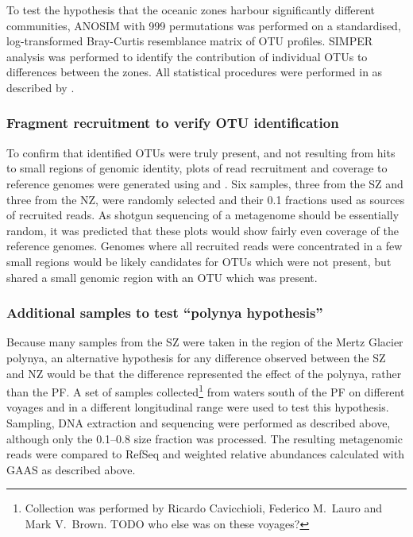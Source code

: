 To test the hypothesis that the oceanic zones harbour significantly different communities, \ac{ANOSIM} with 999 permutations was performed on a standardised, log-transformed Bray-Curtis resemblance matrix of \ac{OTU} profiles.
\ac{SIMPER} analysis was performed to identify the contribution of individual \acp{OTU} to differences between the zones. 
All statistical procedures were performed in  as described by \citet{Clarke:2001ut}.

\subsubsection{Fragment recruitment to verify \ac{OTU} identification}
To confirm that identified \acp{OTU} were truly present, and not resulting from hits to small regions of genomic identity, plots of read recruitment and coverage to reference genomes were generated using  and .
Six samples, three from the \ac{SZ} and three from the \ac{NZ}, were randomly selected and their 0.1 \micron{} fractions used as sources of recruited reads.
As shotgun sequencing of a metagenome should be essentially random, it was predicted that these plots would show fairly even coverage of the reference genomes.
Genomes where all recruited reads were concentrated in a few small regions would be likely candidates for \acp{OTU} which were not present, but shared a small genomic region with an \ac{OTU} which was present.

\subsubsection{Additional samples to test ``polynya hypothesis''}
Because many samples from the \ac{SZ} were taken in the region of the Mertz Glacier polynya, an alternative hypothesis for any difference observed between the \ac{SZ} and \ac{NZ} would be that the difference represented the effect of the polynya, rather than the \ac{PF}.
A set of samples collected\footnote{Collection was performed by Ricardo Cavicchioli, Federico M.\ Lauro and Mark V.\ Brown. TODO who else was on these voyages?} from waters south of the \ac{PF} on different voyages and in a different longitudinal range were used to test this hypothesis.
Sampling, DNA extraction and sequencing were performed as described above, although only the 0.1--0.8 \micron{} size fraction was processed.
The resulting metagenomic reads were compared to RefSeq and weighted relative abundances calculated with \ac{GAAS} as described above.

